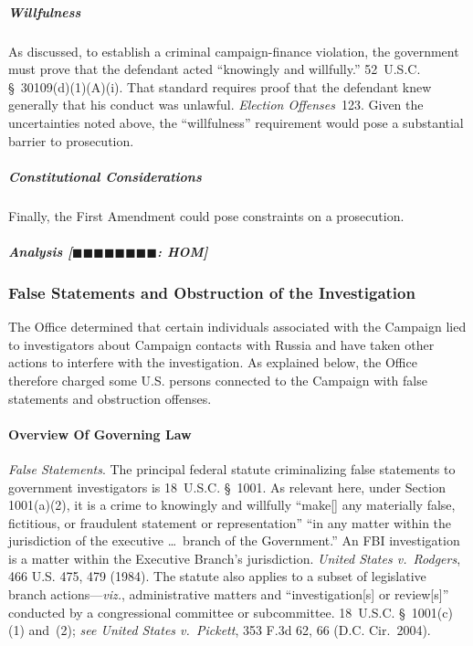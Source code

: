 \subparagraph{Willfulness}
As discussed, to establish a criminal campaign-finance violation, the government must prove that the defendant acted ``knowingly and willfully.''
52~U.S.C. \S~30109(d)(1)(A)(i).
That standard requires proof that the defendant knew generally that his conduct was unlawful.
\textit{Election Offenses}~123.
Given the uncertainties noted above, the ``willfulness'' requirement would pose a substantial barrier to prosecution.

\subparagraph{Constitutional Considerations}
Finally, the First Amendment could pose constraints on a prosecution.

\subparagraph{Analysis [$\blacksquare\blacksquare\blacksquare\blacksquare\blacksquare\blacksquare\blacksquare\blacksquare$: HOM]}



\subsubsection{False Statements and Obstruction of the Investigation}
The Office determined that certain individuals associated with the Campaign lied to investigators about Campaign contacts with Russia and have taken other actions to interfere with the investigation.
As explained below, the Office therefore charged some U.S. persons connected to the Campaign with false statements and obstruction offenses.

\paragraph{Overview Of Governing Law}
\textit{False Statements}.
The principal federal statute criminalizing false statements to government investigators is 18~U.S.C. \S~1001.
As relevant here, under Section 1001(a)(2), it is a crime to knowingly and willfully ``make[] any materially false, fictitious, or fraudulent statement or representation'' ``in any matter within the jurisdiction of the executive \dots\ branch of the Government.''
An FBI investigation is a matter within the Executive Branch's jurisdiction.
\textit{United States v.\ Rodgers}, 466 U.S. 475, 479 (1984).
The statute also applies to a subset of legislative branch actions---\textit{viz.}, administrative matters and ``investigation[s] or review[s]'' conducted by a congressional committee or subcommittee.
18~U.S.C. \S~1001(c)(1) and~(2); \textit{see United States v.\ Pickett}, 353 F.3d 62, 66 (D.C. Cir.~2004).

